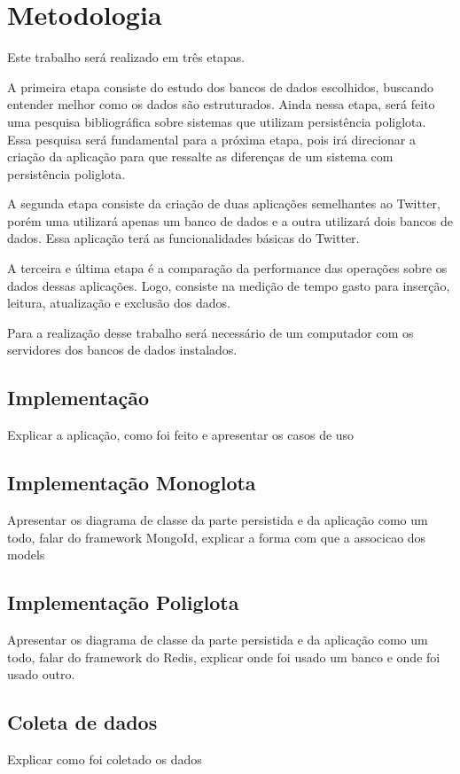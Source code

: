 %
%

\chapter{Metodologia}

Este trabalho será realizado em três etapas.

A primeira etapa consiste do estudo dos bancos de dados escolhidos, buscando entender melhor como os dados são estruturados. Ainda nessa etapa, será feito uma pesquisa bibliográfica sobre sistemas que utilizam persistência poliglota. Essa pesquisa será fundamental para a próxima etapa, pois irá direcionar a criação da aplicação para que ressalte as diferenças de um sistema com persistência poliglota.

A segunda etapa consiste da criação de duas aplicações semelhantes ao Twitter, porém uma utilizará apenas um banco de dados e a outra utilizará dois bancos de dados. Essa aplicação terá as funcionalidades básicas do Twitter.

A terceira e última etapa é a comparação da performance das operações sobre os dados dessas aplicações. Logo, consiste na medição de tempo gasto para inserção, leitura, atualização e exclusão dos dados.

Para a realização desse trabalho será necessário de um computador com os servidores dos bancos de dados instalados.

\section{Implementação}
\label{sec:implementation}
Explicar a aplicação, como foi feito e apresentar os casos de uso

\section{Implementação Monoglota}
\label{sec:monoglot}
Apresentar os diagrama de classe da parte persistida e da aplicação como um todo, falar do framework MongoId, explicar a forma com que a associcao dos models

\section{Implementação Poliglota}
\label{sec:polyglot}
Apresentar os diagrama de classe da parte persistida e da aplicação como um todo, falar do framework do Redis, explicar onde foi usado um banco e onde foi usado outro.

\section{Coleta de dados}
\label{sec:data}
Explicar como foi coletado os dados
